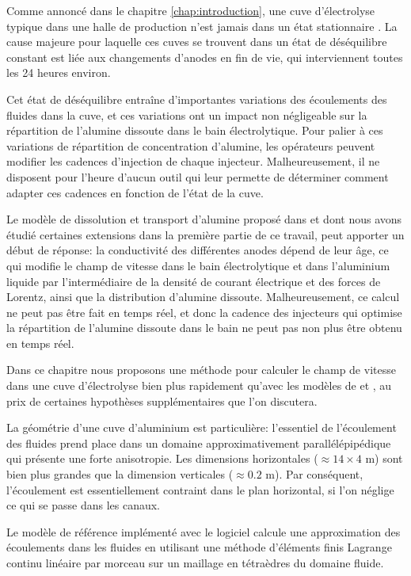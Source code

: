 Comme annoncé dans le chapitre \ref{chap:introduction}, une cuve
d'électrolyse typique dans une halle de production n'est jamais dans
un état stationnaire \cite{Steiner2009,Flotron2013}. La cause
majeure pour laquelle ces cuves se trouvent dans un état de
déséquilibre constant est liée aux changements d'anodes en fin de vie,
qui interviennent toutes les 24 heures environ.

Cet état de déséquilibre entraîne d'importantes variations des
écoulements des fluides dans la cuve, et ces variations ont un impact
non négligeable sur la répartition de l'alumine dissoute dans le bain
électrolytique. Pour palier à ces variations de répartition de
concentration d'alumine, les opérateurs peuvent modifier les cadences
d'injection de chaque injecteur. Malheureusement, il ne disposent pour
l'heure d'aucun outil qui leur permette de déterminer comment adapter
ces cadences en fonction de l'état de la cuve.

Le modèle de dissolution et transport d'alumine proposé dans
\cite{Hofer2011} et dont nous avons étudié certaines extensions dans
la première partie de ce travail, peut apporter un début de réponse: la
conductivité des différentes anodes dépend de leur âge, ce qui modifie
le champ de vitesse dans le bain électrolytique et dans l'aluminium
liquide par l'intermédiaire de la densité de courant
électrique et des forces de Lorentz, ainsi que la distribution d'alumine
dissoute. Malheureusement, ce calcul ne peut pas être fait en temps
réel, et donc la cadence des injecteurs qui optimise la répartition de
l'alumine dissoute dans le bain ne peut pas non plus être obtenu en
temps réel.

Dans ce chapitre nous proposons une méthode pour calculer le champ de
vitesse dans une cuve d'électrolyse bien plus rapidement qu'avec les
modèles de \cite{Steiner2009} et \cite{Hofer2011}, au prix de
certaines hypothèses supplémentaires que l'on discutera.

La géométrie d'une cuve d'aluminium est particulière: l'essentiel de
l'écoulement des fluides prend place dans un domaine approximativement
parallélépipédique qui présente une forte anisotropie. Les dimensions
horizontales ($\approx \num{14}\times\num{4}$ \si{\meter}) sont bien plus
grandes que la dimension verticales ($\approx \num{0.2}$ \si{\meter}). Par
conséquent, l'écoulement est essentiellement contraint dans le plan
horizontal, si l'on néglige ce qui se passe dans les canaux.

Le modèle de référence implémenté avec le logiciel \alucell
\cite{Steiner2009,Flotron2013,Hofer2011,Rochat2016} calcule une
approximation des écoulements dans les fluides en utilisant une
méthode d'éléments finis Lagrange continu linéaire par morceau sur un
maillage en tétraèdres du domaine fluide.

